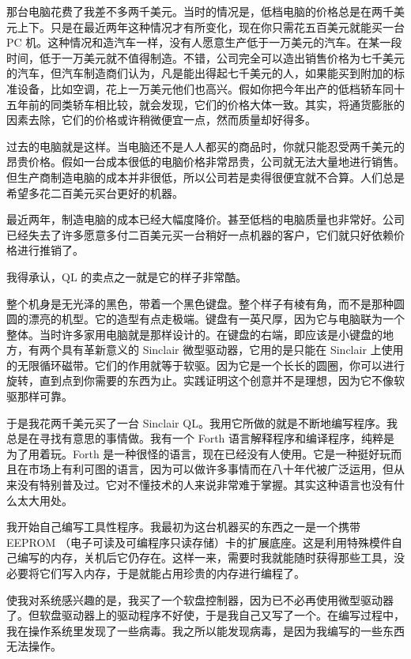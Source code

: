 那台电脑花费了我差不多两千美元。当时的情况是，低档电脑的价格总是在两千美元上下。只是在最近两年这种情况才有所变化，现在你只需花五百美元就能买一台 PC 机。这种情况和造汽车一样，没有人愿意生产低于一万美元的汽车。在某一段时间，低于一万美元就不值得制造。不错，公司完全可以造出销售价格为七千美元的汽车，但汽车制造商们认为，凡是能出得起七千美元的人，如果能买到附加的标准设备，比如空调，花上一万美元他们也高兴。假如你把今年出产的低档轿车同十五年前的同类轿车相比较，就会发现，它们的价格大体一致。其实，将通货膨胀的因素去除，它们的价格或许稍微便宜一点，然而质量却好得多。

过去的电脑就是这样。当电脑还不是人人都买的商品时，你就只能忍受两千美元的昂贵价格。假如一台成本很低的电脑价格非常昂贵，公司就无法大量地进行销售。但生产商制造电脑的成本并非很低，所以公司若是卖得很便宜就不合算。人们总是希望多花二百美元买台更好的机器。

最近两年，制造电脑的成本已经大幅度降价。甚至低档的电脑质量也非常好。公司已经失去了许多愿意多付二百美元买一台稍好一点机器的客户，它们就只好依赖价格进行推销了。

我得承认，QL 的卖点之一就是它的样子非常酷。

整个机身是无光泽的黑色，带着一个黑色键盘。整个样子有棱有角，而不是那种圆圆的漂亮的机型。它的造型有点走极端。键盘有一英尺厚，因为它与电脑联为一个整体。当时许多家用电脑就是那样设计的。在键盘的右端，即应该是小键盘的地方，有两个具有革新意义的 Sinclair 微型驱动器，它用的是只能在 Sinclair 上使用的无限循环磁带。它们的作用就等于软驱。因为它是一个长长的圆圈，你可以进行旋转，直到点到你需要的东西为止。实践证明这个创意并不是理想，因为它不像软驱那样可靠。

于是我花两千美元买了一台 Sinclair QL。我用它所做的就是不断地编写程序。我总是在寻找有意思的事情做。我有一个 Forth 语言解释程序和编译程序，纯粹是为了用着玩。Forth 是一种很怪的语言，现在已经没有人使用。它是一种挺好玩而且在市场上有利可图的语言，因为可以做许多事情而在八十年代被广泛运用，但从来没有特别普及过。它对不懂技术的人来说非常难于掌握。其实这种语言也没有什么太大用处。

我开始自己编写工具性程序。我最初为这台机器买的东西之一是一个携带 EEPROM （电子可读及可编程序只读存储）卡的扩展底座。这是利用特殊模件自己编写的内存，关机后它仍存在。这样一来，需要时我就能随时获得那些工具，没必要将它们写入内存，于是就能占用珍贵的内存进行编程了。

使我对系统感兴趣的是，我买了一个软盘控制器，因为已不必再使用微型驱动器了。但软盘驱动器上的驱动程序不好使，于是我自己又写了一个。在编写过程中，我在操作系统里发现了一些病毒。我之所以能发现病毒，是因为我编写的一些东西无法操作。

